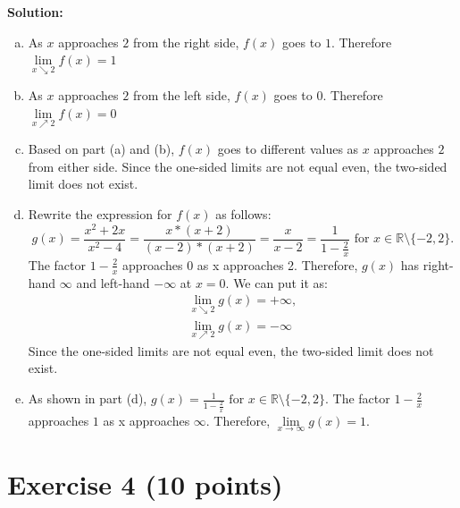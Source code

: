\documentclass[11pt,a4paper]{article}
\begin{document}
\begin{enumerate}[(a)]
\noindent\textbf{\textbf{Solution:}}\\
\begin{enumerate}[a)]
	\item As $x$ approaches $2$ from the right side, $f(x)$ goes to $1$. Therefore  $\underset{x \searrow 2}{\lim} f(x) = 1$
	\item As $x$ approaches $2$ from the left side, $f(x)$ goes to $0$. Therefore  $\underset{x \nearrow 2}{\lim} f(x) = 0$
	\item Based on part (a) and (b), $f(x)$ goes to different values as $x$ approaches $2$ from either side. Since the one-sided limits are not equal even, the two-sided limit does not exist.
	\item Rewrite the expression for $f(x)$ as follows:
	\begin{equation*}
g(x) = \frac{x^2 + 2x}{x^2 - 4} 
= \frac{x*(x + 2)}{(x-2)*(x + 2)}
=\frac{x}{x-2}=\frac{1}{1-\frac{2}{x} }\text{ for } x \in \mathbb{R} \setminus \{-2, 2 \}.
	\end{equation*}
	The factor $1-\frac{2}{x}$ approaches $0$ as x approaches 2. Therefore, $g(x)$ has right-hand $\infty$ and left-hand $-\infty$ at $x=0$. We can put it as:	
	\begin{align*}
		\underset{x \searrow 2}{\lim} g(x) = +\infty,\\
		\underset{x \nearrow 2}{\lim} g(x)  =- \infty
	\end{align*}
	Since the one-sided limits are not equal even, the two-sided limit does not exist.

	\item As shown in part (d), $g(x) =\frac{1}{1-\frac{2}{x} }\text{ for } x \in \mathbb{R} \setminus \{-2, 2 \}$. The factor $1-\frac{2}{x}$ approaches $1$ as x approaches $\infty$. Therefore, $\underset{x \to \infty}{\lim} g(x)  = 1$.
\end{enumerate}

\section*{Exercise 4 (10 points)}


\end{enumerate}
\end{document}
